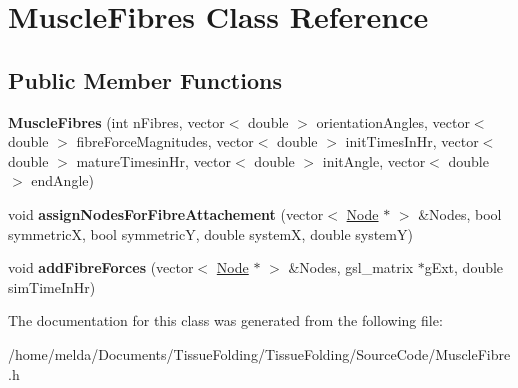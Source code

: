 \hypertarget{classMuscleFibres}{}\section{Muscle\+Fibres Class Reference}
\label{classMuscleFibres}
\subsection*{Public Member Functions}
\begin{DoxyCompactItemize}
\item 
\hypertarget{classMuscleFibres_a5902a8d354154a735c091854897005bb}{}{\bfseries Muscle\+Fibres} (int n\+Fibres, vector$<$ double $>$ orientation\+Angles, vector$<$ double $>$ fibre\+Force\+Magnitudes, vector$<$ double $>$ init\+Times\+In\+Hr, vector$<$ double $>$ mature\+Timesin\+Hr, vector$<$ double $>$ init\+Angle, vector$<$ double $>$ end\+Angle)\label{classMuscleFibres_a5902a8d354154a735c091854897005bb}

\item 
\hypertarget{classMuscleFibres_a971ef119b1a9252865d5c34b8243c316}{}void {\bfseries assign\+Nodes\+For\+Fibre\+Attachement} (vector$<$ \hyperlink{classNode}{Node} $\ast$ $>$ \&Nodes, bool symmetric\+X, bool symmetric\+Y, double system\+X, double system\+Y)\label{classMuscleFibres_a971ef119b1a9252865d5c34b8243c316}

\item 
\hypertarget{classMuscleFibres_afa1d97efea925aff77af971bb80a9e7e}{}void {\bfseries add\+Fibre\+Forces} (vector$<$ \hyperlink{classNode}{Node} $\ast$ $>$ \&Nodes, gsl\+\_\+matrix $\ast$g\+Ext, double sim\+Time\+In\+Hr)\label{classMuscleFibres_afa1d97efea925aff77af971bb80a9e7e}

\end{DoxyCompactItemize}


The documentation for this class was generated from the following file\+:\begin{DoxyCompactItemize}
\item 
/home/melda/\+Documents/\+Tissue\+Folding/\+Tissue\+Folding/\+Source\+Code/Muscle\+Fibre.\+h\end{DoxyCompactItemize}
